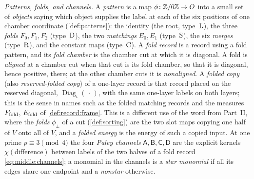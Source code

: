\emph{Patterns, folds, and channels.}
A \emph{pattern} is a map $\phi\colon\mathbb Z/6\mathbb Z\to O$ into a small set of
\emph{objects} saying which object supplies the label at each of the
six positions of one chamber coordinate (\cref{def:patterns}): the
identity (the root, type~$\rm L$), the three \emph{folds}
$F_0,F_1,F_2$ (type~$\rm D$), the two \emph{matchings} $E_0,E_1$
(type~$\rm S$), the six \emph{merges} (type~$\rm R$), and the
constant maps (type~$\rm C$). A \emph{fold record} is a record using
a fold pattern, and its \emph{fold chamber} is the chamber cut at
which it is diagonal. A fold is \emph{aligned} at a chamber cut
when that cut is its fold chamber, so that it is diagonal, hence
positive, there; at the other chamber cuts it is
\emph{nonaligned}. A \emph{folded copy} (also
\emph{reserved-folded copy}) of a one-layer record is that record
placed on the reserved diagonal,
$\operatorname{Diag}_\iota(\,\cdot\,)$, with the same one-layer
labels on both layers; this is the sense in names such as the
folded matching records and the measures $F_{\rm fold}$,
$E_{\rm fold}$ of \cref{def:record:frame}. This is a different use of the word from
Part~II, where the \emph{folds} $\phi_\pm$ of a cut
(\cref{def:sorting}) are the two slot maps copying one half of $V$
onto all of $V$, and a \emph{folded energy} is the energy of such a
copied input. At one prime $p\equiv3\pmod4$ the four \emph{Paley
channels} $\mathsf A,\mathsf B,\mathsf C,\mathsf D$ are the explicit
kernels $\chi(\text{difference})$ between labels of the two halves
of a fold record \eqref{eq:middle:channels}; a monomial in the
channels is a \emph{star monomial} if all its edges share one
endpoint and a \emph{nonstar} otherwise.

